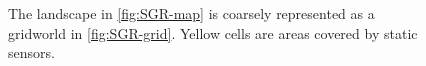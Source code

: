\begin{figure}
{}


\caption{The landscape in \ref{fig:SGR-map} is coarsely represented as a gridworld in \ref{fig:SGR-grid}. Yellow cells are areas covered by static sensors.}
\label{fig:casestudy}
\end{figure}

